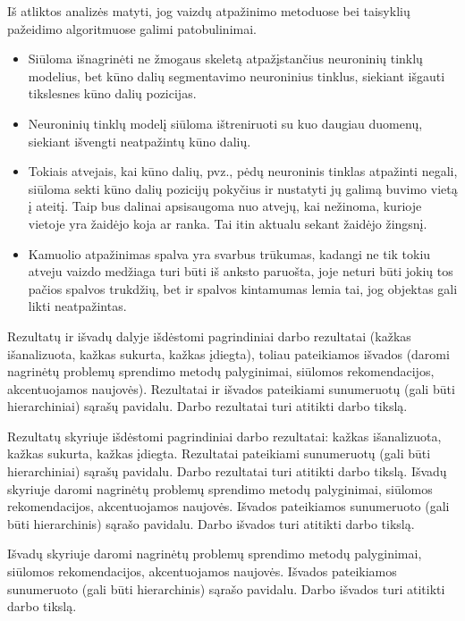 \documentclass{VUMIFPSbakalaurinis}
\begin{document}
Iš atliktos analizės matyti, jog vaizdų atpažinimo metoduose bei taisyklių pažeidimo algoritmuose galimi patobulinimai. 

\begin{itemize}
	\item Siūloma išnagrinėti ne žmogaus skeletą atpažįstančius neuroninių tinklų modelius, bet kūno dalių segmentavimo neuroninius tinklus, siekiant išgauti tikslesnes kūno dalių pozicijas.
	\item Neuroninių tinklų modelį siūloma ištreniruoti su kuo daugiau duomenų, siekiant išvengti neatpažintų kūno dalių. 
	\item Tokiais atvejais, kai kūno dalių, pvz., pėdų neuroninis tinklas atpažinti negali, siūloma sekti kūno dalių pozicijų pokyčius ir nustatyti jų galimą buvimo vietą į ateitį. Taip bus dalinai apsisaugoma nuo atvejų, kai nežinoma, kurioje vietoje yra žaidėjo koja ar ranka. Tai itin aktualu sekant žaidėjo žingsnį.
	\item Kamuolio atpažinimas spalva yra svarbus trūkumas, kadangi ne tik tokiu atveju vaizdo medžiaga turi būti iš anksto paruošta, joje neturi būti jokių tos pačios spalvos trukdžių, bet ir spalvos kintamumas lemia tai, jog objektas gali likti neatpažintas. 
\end{itemize}

Rezultatų ir išvadų dalyje išdėstomi pagrindiniai darbo rezultatai (kažkas
išanalizuota, kažkas sukurta, kažkas įdiegta), toliau pateikiamos išvados
(daromi nagrinėtų problemų sprendimo metodų palyginimai, siūlomos
rekomendacijos, akcentuojamos naujovės). Rezultatai ir išvados pateikiami
sunumeruotų (gali būti hierarchiniai) sąrašų pavidalu. Darbo rezultatai turi
atitikti darbo tikslą.

Rezultatų skyriuje išdėstomi pagrindiniai darbo rezultatai: kažkas išanalizuota, kažkas sukurta, kažkas įdiegta. Rezultatai pateikiami sunumeruotų (gali būti hierarchiniai) sąrašų pavidalu. Darbo rezultatai turi atitikti darbo tikslą.
Išvadų skyriuje daromi nagrinėtų problemų sprendimo metodų palyginimai, siūlomos rekomendacijos, akcentuojamos naujovės. Išvados pateikiamos sunumeruoto (gali būti hierarchinis) sąrašo pavidalu. Darbo išvados turi atitikti darbo tikslą. 


Išvadų skyriuje daromi nagrinėtų problemų sprendimo metodų palyginimai, siūlomos rekomendacijos, akcentuojamos naujovės. Išvados pateikiamos sunumeruoto (gali būti hierarchinis) sąrašo pavidalu. Darbo išvados turi atitikti darbo tikslą. 
\end{document}
